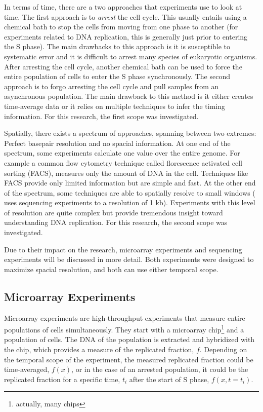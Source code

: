 	In terms of time, there are a two approaches that experiments use to look at time.
	The first approach is to \emph{arrest} the cell cycle.
	This usually entails using a chemical bath to stop the cells from moving from one phase to another (for experiments related to DNA replication, this is generally just prior to entering the S phase).
	The main drawbacks to this approach is it is susceptible to systematic error and it is difficult to arrest many species of eukaryotic organisms.
	After arresting the cell cycle, another chemical bath can be used to force the entire population of cells to enter the S phase synchronously.
	The second approach is to forgo arresting the cell cycle and pull samples from an asynchronous population.
	The main drawback to this method is it either creates time-average data or it relies on multiple techniques to infer the timing information.
	For this research, the first scope was investigated.
	
	Spatially, there exists a spectrum of approaches, spanning between two extremes: Perfect basepair resolution and no spacial information.
	At one end of the spectrum, some experiments calculate one value over the entire genome. 
	For example a common flow cytometry technique called florescence activated cell sorting (FACS), measures only the amount of DNA in the cell.
	Techniques like FACS provide only limited information but are simple and fast.
	At the other end of the spectrum, some techniques are able to spatially resolve to small windows (\cite{DeepSeq} uses sequencing experiments to a resolution of 1 kb).
	Experiments with this level of resolution are quite complex but provide tremendous insight toward understanding DNA replication.
	For this research, the second scope was investigated.
	
	Due to their impact on the research, microarray experiments and sequencing experiments will be discussed in more detail. Both experiments were designed to maximize spacial resolution, and both can use either temporal scope.
	
		\subsection{Microarray Experiments}
		\label{subsec:Microarray}
		
		Microarray experiments are high-throughput experiments that measure entire populations of cells simultaneously.
		They start with a microarray chip\footnote{actually, many chips} and a population of cells.
		The DNA of the population is extracted and hybridized with the chip, which provides a measure of the replicated fraction, $f$.
		Depending on the temporal scope of the experiment, the measured replicated fraction could be time-averaged, $f(x)$, or in the case of an arrested population, it could be the replicated fraction for a specific time, $t_i$ after the start of S phase, $f(x,t=t_i)$.
		
